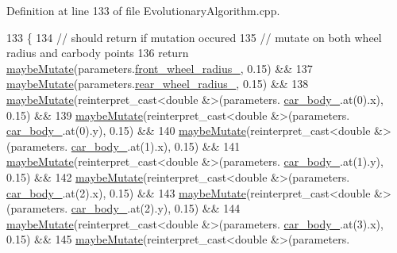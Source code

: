 Definition at line 133 of file Evolutionary\+Algorithm.\+cpp.


\begin{DoxyCode}
133                                                                         \{
134     \textcolor{comment}{// should return if mutation occured}
135     \textcolor{comment}{// mutate on both wheel radius and carbody points}
136     \textcolor{keywordflow}{return} \hyperlink{classEvolutionaryAlgorithm_a19c58cc0434d314fb5378e3674546988}{maybeMutate}(parameters.\hyperlink{classCarParameters_ab66832af7618ebe04364630c92850096}{front\_wheel\_radius\_}, 0.15) &&
137            \hyperlink{classEvolutionaryAlgorithm_a19c58cc0434d314fb5378e3674546988}{maybeMutate}(parameters.\hyperlink{classCarParameters_a6d3c3fc1c4eef292a7f536da2a089bbd}{rear\_wheel\_radius\_}, 0.15) &&
138            \hyperlink{classEvolutionaryAlgorithm_a19c58cc0434d314fb5378e3674546988}{maybeMutate}(reinterpret\_cast<double &>(parameters.
      \hyperlink{classCarParameters_a304345d7fd7771c87421e87785bce810}{car\_body\_}.at(0).x), 0.15) &&
139            \hyperlink{classEvolutionaryAlgorithm_a19c58cc0434d314fb5378e3674546988}{maybeMutate}(reinterpret\_cast<double &>(parameters.
      \hyperlink{classCarParameters_a304345d7fd7771c87421e87785bce810}{car\_body\_}.at(0).y), 0.15) &&
140            \hyperlink{classEvolutionaryAlgorithm_a19c58cc0434d314fb5378e3674546988}{maybeMutate}(reinterpret\_cast<double &>(parameters.
      \hyperlink{classCarParameters_a304345d7fd7771c87421e87785bce810}{car\_body\_}.at(1).x), 0.15) &&
141            \hyperlink{classEvolutionaryAlgorithm_a19c58cc0434d314fb5378e3674546988}{maybeMutate}(reinterpret\_cast<double &>(parameters.
      \hyperlink{classCarParameters_a304345d7fd7771c87421e87785bce810}{car\_body\_}.at(1).y), 0.15) &&
142            \hyperlink{classEvolutionaryAlgorithm_a19c58cc0434d314fb5378e3674546988}{maybeMutate}(reinterpret\_cast<double &>(parameters.
      \hyperlink{classCarParameters_a304345d7fd7771c87421e87785bce810}{car\_body\_}.at(2).x), 0.15) &&
143            \hyperlink{classEvolutionaryAlgorithm_a19c58cc0434d314fb5378e3674546988}{maybeMutate}(reinterpret\_cast<double &>(parameters.
      \hyperlink{classCarParameters_a304345d7fd7771c87421e87785bce810}{car\_body\_}.at(2).y), 0.15) &&
144            \hyperlink{classEvolutionaryAlgorithm_a19c58cc0434d314fb5378e3674546988}{maybeMutate}(reinterpret\_cast<double &>(parameters.
      \hyperlink{classCarParameters_a304345d7fd7771c87421e87785bce810}{car\_body\_}.at(3).x), 0.15) &&
145            \hyperlink{classEvolutionaryAlgorithm_a19c58cc0434d314fb5378e3674546988}{maybeMutate}(reinterpret\_cast<double &>(parameters.

\end{DoxyCode}
